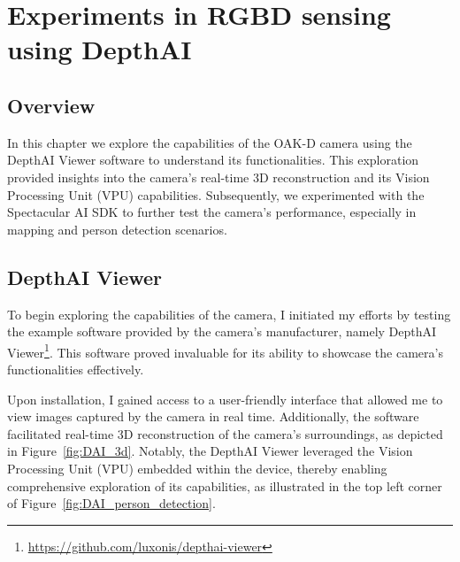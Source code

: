 \chapter{Experiments in RGBD sensing using DepthAI} \label{experiments_oak_d}

\section{Overview}


In this chapter we explore the capabilities of the OAK-D camera using the DepthAI Viewer software to understand its functionalities. This exploration provided insights into the camera's real-time 3D reconstruction and its Vision Processing Unit (VPU) capabilities. Subsequently, we experimented with the Spectacular AI SDK to further test the camera's performance, especially in mapping and person detection scenarios.


\section{DepthAI Viewer}

To begin exploring the capabilities of the camera, I initiated my efforts by testing the example software provided by the camera's manufacturer, namely DepthAI Viewer\footnote{\url{https://github.com/luxonis/depthai-viewer}}. This software proved invaluable for its ability to showcase the camera's functionalities effectively.

Upon installation, I gained access to a user-friendly interface that allowed me to view images captured by the camera in real time. Additionally, the software facilitated real-time 3D reconstruction of the camera's surroundings, as depicted in Figure~\ref{fig:DAI_3d}. Notably, the DepthAI Viewer leveraged the Vision Processing Unit (VPU) embedded within the device, thereby enabling comprehensive exploration of its capabilities, as illustrated in the top left corner of Figure~\ref{fig:DAI_person_detection}.

